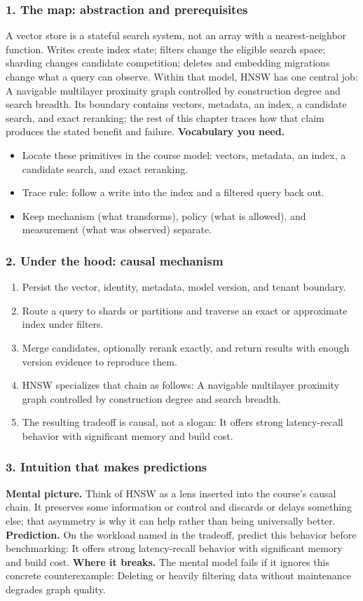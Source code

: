 \subsubsection*{1. The map: abstraction and prerequisites}
A vector store is a stateful search system, not an array with a nearest-neighbor function. Writes create index state; filters change the eligible search space; sharding changes candidate competition; deletes and embedding migrations change what a query can observe.
Within that model, HNSW has one central job: A navigable multilayer proximity graph controlled by construction degree and search breadth. Its boundary contains vectors, metadata, an index, a candidate search, and exact reranking; the rest of this chapter traces how that claim produces the stated benefit and failure.
\textbf{Vocabulary you need.}\begin{itemize}
\item Locate these primitives in the course model: vectors, metadata, an index, a candidate search, and exact reranking.
\item Trace rule: follow a write into the index and a filtered query back out.
\item Keep mechanism (what transforms), policy (what is allowed), and measurement (what was observed) separate.
\end{itemize}
\subsubsection*{2. Under the hood: causal mechanism}\begin{enumerate}
\item Persist the vector, identity, metadata, model version, and tenant boundary.
\item Route a query to shards or partitions and traverse an exact or approximate index under filters.
\item Merge candidates, optionally rerank exactly, and return results with enough version evidence to reproduce them.
\item HNSW specializes that chain as follows: A navigable multilayer proximity graph controlled by construction degree and search breadth.
\item The resulting tradeoff is causal, not a slogan: It offers strong latency-recall behavior with significant memory and build cost.
\end{enumerate}
\subsubsection*{3. Intuition that makes predictions}
\textbf{Mental picture.} Think of HNSW as a lens inserted into the course's causal chain. It preserves some information or control and discards or delays something else; that asymmetry is why it can help rather than being universally better.
\textbf{Prediction.} On the workload named in the tradeoff, predict this behavior before benchmarking: It offers strong latency-recall behavior with significant memory and build cost.
\textbf{Where it breaks.} The mental model fails if it ignores this concrete counterexample: Deleting or heavily filtering data without maintenance degrades graph quality.
